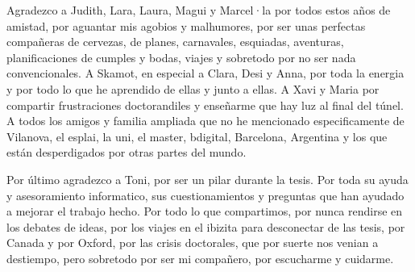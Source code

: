 \begin{acknowledgements}
Agradezco a Judith, Lara, Laura, Magui y Marcel·la por todos estos años de amistad, por aguantar mis agobios y malhumores, por ser unas perfectas compañeras de cervezas, de planes, carnavales, esquiadas, aventuras, planificaciones de cumples y bodas, viajes y sobretodo por no ser nada convencionales. A Skamot, en especial a Clara, Desi y Anna, por toda la energia y por todo lo que he aprendido de ellas y junto a ellas. A Xavi y Maria por compartir frustraciones doctorandiles y enseñarme que hay luz al final del túnel. A todos los amigos y familia ampliada que no he mencionado especificamente de Vilanova, el esplai, la uni, el master, bdigital, Barcelona, Argentina y los que están desperdigados por otras partes del mundo.

Por último agradezco a Toni, por ser un pilar durante la tesis. Por toda su ayuda y asesoramiento informatico, sus cuestionamientos y preguntas que han ayudado a mejorar el trabajo hecho. Por todo lo que compartimos, por nunca rendirse en los debates de ideas, por los viajes en el ibizita para desconectar de las tesis, por Canada y por Oxford, por las crisis doctorales, que por suerte nos venian a destiempo, pero sobretodo por ser mi compañero, por escucharme y cuidarme. 

\end{acknowledgements}